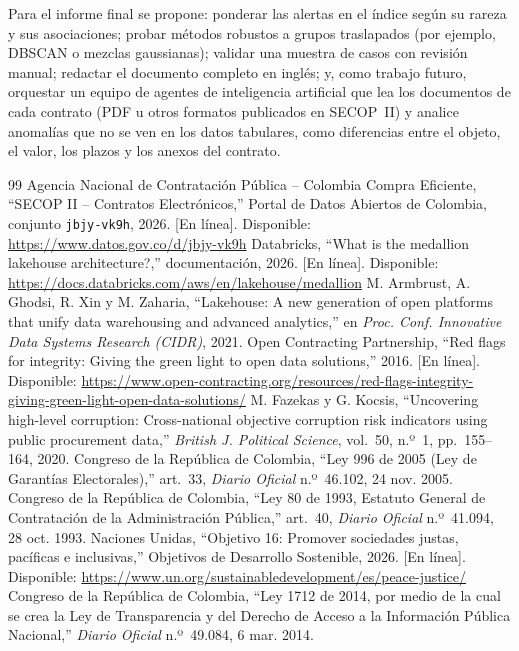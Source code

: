 \documentclass[conference,a4paper]{IEEEtran}
\begin{document}
Para el informe final se propone: ponderar las alertas en el índice según su rareza y sus asociaciones; probar
métodos robustos a grupos traslapados (por ejemplo, DBSCAN o mezclas gaussianas); validar una muestra de casos con
revisión manual; redactar el documento completo en inglés; y, como trabajo futuro, orquestar un equipo de agentes de inteligencia artificial que lea los documentos de cada contrato (PDF u otros formatos publicados en SECOP~II) y analice anomalías que no se ven en los datos tabulares, como diferencias entre el objeto, el valor, los plazos y los anexos del contrato.

\begin{thebibliography}{99}
 Agencia Nacional de Contratación Pública -- Colombia Compra Eficiente, ``SECOP II -- Contratos Electrónicos,'' Portal de Datos Abiertos de Colombia, conjunto \texttt{jbjy-vk9h}, 2026. [En línea]. Disponible: \url{https://www.datos.gov.co/d/jbjy-vk9h}
 Databricks, ``What is the medallion lakehouse architecture?,'' documentación, 2026. [En línea]. Disponible: \url{https://docs.databricks.com/aws/en/lakehouse/medallion}
 M. Armbrust, A. Ghodsi, R. Xin y M. Zaharia, ``Lakehouse: A new generation of open platforms that unify data warehousing and advanced analytics,'' en \emph{Proc. Conf. Innovative Data Systems Research (CIDR)}, 2021.
 Open Contracting Partnership, ``Red flags for integrity: Giving the green light to open data solutions,'' 2016. [En línea]. Disponible: \url{https://www.open-contracting.org/resources/red-flags-integrity-giving-green-light-open-data-solutions/}
 M. Fazekas y G. Kocsis, ``Uncovering high-level corruption: Cross-national objective corruption risk indicators using public procurement data,'' \emph{British J. Political Science}, vol.~50, n.º~1, pp.~155--164, 2020.
 Congreso de la República de Colombia, ``Ley 996 de 2005 (Ley de Garantías Electorales),'' art.~33, \emph{Diario Oficial} n.º~46.102, 24 nov. 2005.
 Congreso de la República de Colombia, ``Ley 80 de 1993, Estatuto General de Contratación de la Administración Pública,'' art.~40, \emph{Diario Oficial} n.º~41.094, 28 oct. 1993.
 Naciones Unidas, ``Objetivo 16: Promover sociedades justas, pacíficas e inclusivas,'' Objetivos de Desarrollo Sostenible, 2026. [En línea]. Disponible: \url{https://www.un.org/sustainabledevelopment/es/peace-justice/}
 Congreso de la República de Colombia, ``Ley 1712 de 2014, por medio de la cual se crea la Ley de Transparencia y del Derecho de Acceso a la Información Pública Nacional,'' \emph{Diario Oficial} n.º~49.084, 6 mar. 2014.

\end{thebibliography}
\end{document}

